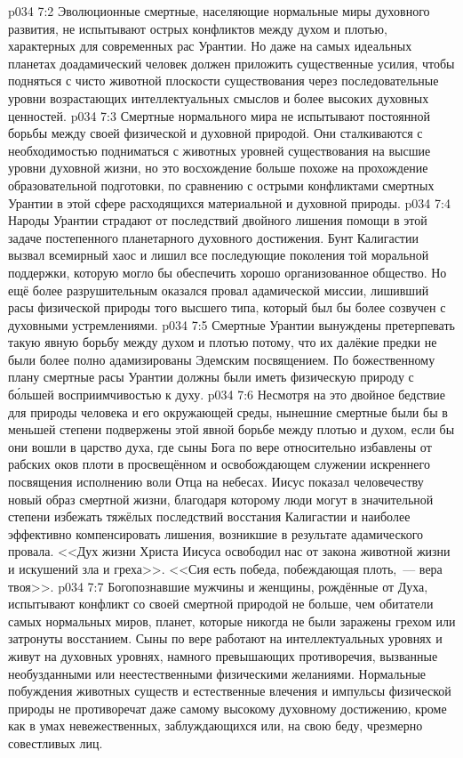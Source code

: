 \vs p034 7:2 Эволюционные смертные, населяющие нормальные миры духовного развития, не испытывают острых конфликтов между духом и плотью, характерных для современных рас Урантии. Но даже на самых идеальных планетах доадамический человек должен приложить существенные усилия, чтобы подняться с чисто животной плоскости существования через последовательные уровни возрастающих интеллектуальных смыслов и более высоких духовных ценностей.
\vs p034 7:3 Смертные нормального мира не испытывают постоянной борьбы между своей физической и духовной природой. Они сталкиваются с необходимостью подниматься с животных уровней существования на высшие уровни духовной жизни, но это восхождение больше похоже на прохождение образовательной подготовки, по сравнению с острыми конфликтами смертных Урантии в этой сфере расходящихся материальной и духовной природы.
\vs p034 7:4 \pc Народы Урантии страдают от последствий двойного лишения помощи в этой задаче постепенного планетарного духовного достижения. Бунт Калигастии вызвал всемирный хаос и лишил все последующие поколения той моральной поддержки, которую могло бы обеспечить хорошо организованное общество. Но ещё более разрушительным оказался провал адамической миссии, лишивший расы физической природы того высшего типа, который был бы более созвучен с духовными устремлениями.
\vs p034 7:5 Смертные Урантии вынуждены претерпевать такую явную борьбу между духом и плотью потому, что их далёкие предки не были более полно адамизированы Эдемским посвящением. По божественному плану смертные расы Урантии должны были иметь физическую природу с б\'ольшей восприимчивостью к духу.
\vs p034 7:6 \pc Несмотря на это двойное бедствие для природы человека и его окружающей среды, нынешние смертные были бы в меньшей степени подвержены этой явной борьбе между плотью и духом, если бы они вошли в царство духа, где сыны Бога по вере относительно избавлены от рабских оков плоти в просвещённом и освобождающем служении искреннего посвящения исполнению воли Отца на небесах. Иисус показал человечеству новый образ смертной жизни, благодаря которому люди могут в значительной степени избежать тяжёлых последствий восстания Калигастии и наиболее эффективно компенсировать лишения, возникшие в результате адамического провала. <<Дух жизни Христа Иисуса освободил нас от закона животной жизни и искушений зла и греха>>. <<Сия есть победа, побеждающая плоть,~--- вера твоя>>.
\vs p034 7:7 Богопознавшие мужчины и женщины, рождённые от Духа, испытывают конфликт со своей смертной природой не больше, чем обитатели самых нормальных миров, планет, которые никогда не были заражены грехом или затронуты восстанием. Сыны по вере работают на интеллектуальных уровнях и живут на духовных уровнях, намного превышающих противоречия, вызванные необузданными или неестественными физическими желаниями. Нормальные побуждения животных существ и естественные влечения и импульсы физической природы не противоречат даже самому высокому духовному достижению, кроме как в умах невежественных, заблуждающихся или, на свою беду, чрезмерно совестливых лиц.

